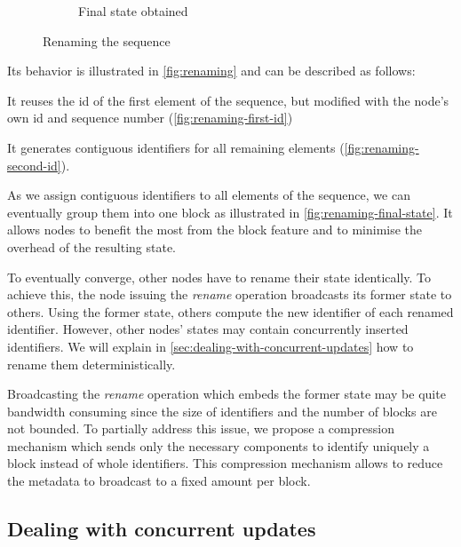 \documentclass[sigplan,10pt]{acmart}
\begin{document}
\begin{figure}[ht!]
\begin{subfigure}{\columnwidth}
        \caption{Final state obtained}
        \label{fig:renaming-final-state}
    \end{subfigure}
    \caption{Renaming the sequence}
    \label{fig:renaming}
\end{figure}

Its behavior is illustrated in \autoref{fig:renaming} and can be described as follows:
\begin{enumerate*}
    \item It reuses the id of the first element of the sequence, but modified with the node's own id and sequence number (\autoref{fig:renaming-first-id})
    \item It generates contiguous identifiers for all remaining elements (\autoref{fig:renaming-second-id}).
\end{enumerate*}
As we assign contiguous identifiers to all elements of the sequence, we can eventually group them into one block as illustrated in \autoref{fig:renaming-final-state}.
It allows nodes to benefit the most from the block feature and to minimise the overhead of the resulting state.

To eventually converge, other nodes have to rename their state identically.
To achieve this, the node issuing the \emph{rename} operation broadcasts its former state to others.
Using the former state, others compute the new identifier of each renamed identifier.
However, other nodes' states may contain concurrently inserted identifiers.
We will explain in \autoref{sec:dealing-with-concurrent-updates} how to rename them deterministically.

Broadcasting the \emph{rename} operation which embeds the former state may be quite bandwidth consuming since the size of identifiers and the number of blocks are not bounded.
To partially address this issue, we propose a compression mechanism which sends only the necessary components to identify uniquely a block instead of whole identifiers.
This compression mechanism allows to reduce the metadata to broadcast to a fixed amount per block.

\subsection{Dealing with concurrent updates}

\label{sec:dealing-with-concurrent-updates}
\end{document}
